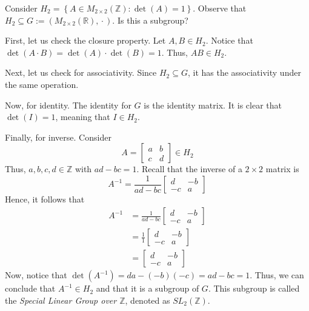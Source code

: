\begin{nexample}
    Consider \(H_2 = \left\{A \in M_{2 \times 2}(\mathbb{Z}) : \det(A) = 1\right\}\). Observe that \(H_2 \subseteq G := (M_{2 \times 2}(\mathbb{R}), {}\cdot{})\). Is this a subgroup?

    First, let us check the closure property. Let \(A, B \in H_2\). Notice that \(\det(A \cdot B) = \det(A) \cdot \det(B) = 1\). Thus, \(AB \in H_2\).

    Next, let us check for associativity. Since \(H_2 \subseteq G\), it has the associativity under the same operation.

    Now, for identity. The identity for \(G\) is the identity matrix. It is clear that \(\det(I) = 1\), meaning that \(I \in H_2\).

    Finally, for inverse. Consider
    \[
        A = \begin{bmatrix}
            a & b \\
            c & d
        \end{bmatrix} \in H_2
    \]
    Thus, \(a, b, c, d \in \mathbb{Z}\) with \(ad - bc = 1\). Recall that the inverse of a \(2 \times 2\) matrix is
    \[
        A^{-1} = \frac{1}{ad - bc}\begin{bmatrix}
            d & -b \\
            -c & a
        \end{bmatrix}
    \]
    Hence, it follows that
    \[
    \begin{aligned}
        A^{-1} &= \frac{1}{ad - bc}\begin{bmatrix}
                    d & -b \\
                    -c & a
               \end{bmatrix} \\
               &= \frac{1}{1}\begin{bmatrix}
                   d & -b \\
                   -c & a
               \end{bmatrix} \\
               &= \begin{bmatrix}
                   d & -b \\
                   -c & a
               \end{bmatrix}
    \end{aligned}
    \]
    Now, notice that \(\det(A^{-1}) = da - (-b)(-c) = ad - bc = 1\). Thus, we can conclude that \(A^{-1} \in H_2\) and that it is a subgroup of \(G\). This subgroup is called the \textit{Special Linear Group over \(\mathbb{Z}\)}, denoted as \(SL_2(\mathbb{Z})\).
\end{nexample}

